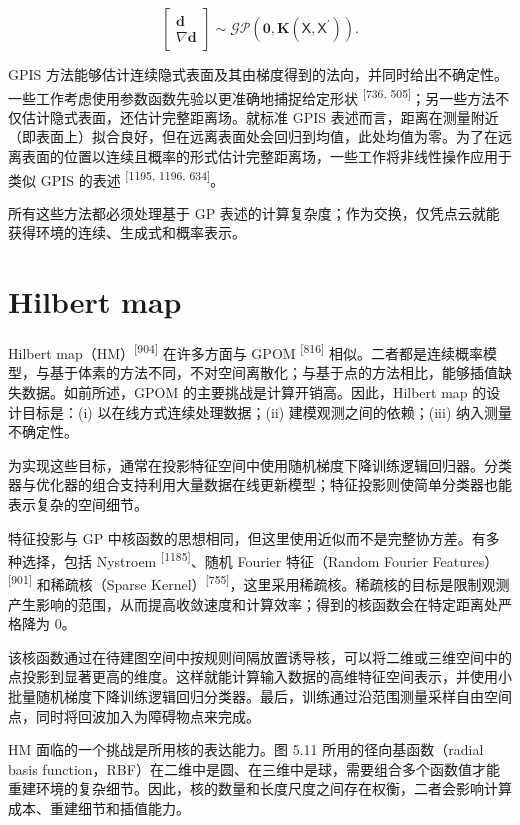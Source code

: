 \begin{equation}
\left[ \begin{array}{c} \boldsymbol {d} \\ \nabla \boldsymbol {d} \end{array} \right] \sim \mathcal {GP} (\boldsymbol {0}, \boldsymbol {K} (\mathsf {X}, \mathsf {X} ^ {\prime})).\tag{5.12}
\end{equation}

GPIS 方法能够估计连续隐式表面及其由梯度得到的法向，并同时给出不确定性。一些工作考虑使用参数函数先验以更准确地捕捉给定形状 \textsuperscript{[736, 505]}；另一些方法不仅估计隐式表面，还估计完整距离场。就标准 GPIS 表述而言，距离在测量附近（即表面上）拟合良好，但在远离表面处会回归到均值，此处均值为零。为了在远离表面的位置以连续且概率的形式估计完整距离场，一些工作将非线性操作应用于类似 GPIS 的表述 \textsuperscript{[1195, 1196, 634]}。

所有这些方法都必须处理基于 GP 表述的计算复杂度；作为交换，仅凭点云就能获得环境的连续、生成式和概率表示。

\section{Hilbert map}

Hilbert map（HM）\textsuperscript{[904]} 在许多方面与 GPOM \textsuperscript{[816]} 相似。二者都是连续概率模型，与基于体素的方法不同，不对空间离散化；与基于点的方法相比，能够插值缺失数据。如前所述，GPOM 的主要挑战是计算开销高。因此，Hilbert map 的设计目标是：(i) 以在线方式连续处理数据；(ii) 建模观测之间的依赖；(iii) 纳入测量不确定性。

为实现这些目标，通常在投影特征空间中使用随机梯度下降训练逻辑回归器。分类器与优化器的组合支持利用大量数据在线更新模型；特征投影则使简单分类器也能表示复杂的空间细节。

特征投影与 GP 中核函数的思想相同，但这里使用近似而不是完整协方差。有多种选择，包括 Nystroem \textsuperscript{[1185]}、随机 Fourier 特征（Random Fourier Features）\textsuperscript{[901]} 和稀疏核（Sparse Kernel）\textsuperscript{[755]}，这里采用稀疏核。稀疏核的目标是限制观测产生影响的范围，从而提高收敛速度和计算效率；得到的核函数会在特定距离处严格降为 0。

该核函数通过在待建图空间中按规则间隔放置诱导核，可以将二维或三维空间中的点投影到显著更高的维度。这样就能计算输入数据的高维特征空间表示，并使用小批量随机梯度下降训练逻辑回归分类器。最后，训练通过沿范围测量采样自由空间点，同时将回波加入为障碍物点来完成。

HM 面临的一个挑战是所用核的表达能力。图 5.11 所用的径向基函数（radial basis function，RBF）在二维中是圆、在三维中是球，需要组合多个函数值才能重建环境的复杂细节。因此，核的数量和长度尺度之间存在权衡，二者会影响计算成本、重建细节和插值能力。

